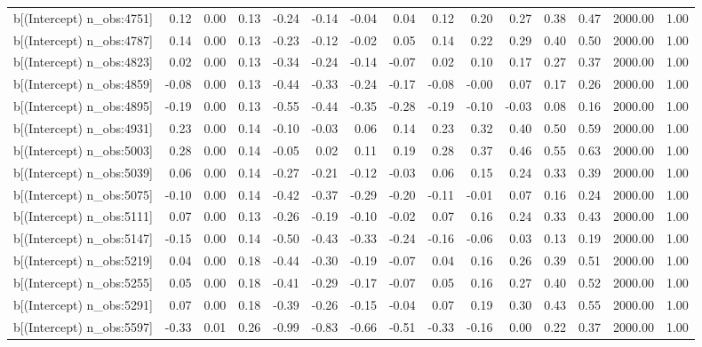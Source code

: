 \begin{table}[ht]
\begin{tabular}{rrrrrrrrrrrrrrr}
  b[(Intercept) n\_obs:4751] & 0.12 & 0.00 & 0.13 & -0.24 & -0.14 & -0.04 & 0.04 & 0.12 & 0.20 & 0.27 & 0.38 & 0.47 & 2000.00 & 1.00 \\ 
  b[(Intercept) n\_obs:4787] & 0.14 & 0.00 & 0.13 & -0.23 & -0.12 & -0.02 & 0.05 & 0.14 & 0.22 & 0.29 & 0.40 & 0.50 & 2000.00 & 1.00 \\ 
  b[(Intercept) n\_obs:4823] & 0.02 & 0.00 & 0.13 & -0.34 & -0.24 & -0.14 & -0.07 & 0.02 & 0.10 & 0.17 & 0.27 & 0.37 & 2000.00 & 1.00 \\ 
  b[(Intercept) n\_obs:4859] & -0.08 & 0.00 & 0.13 & -0.44 & -0.33 & -0.24 & -0.17 & -0.08 & -0.00 & 0.07 & 0.17 & 0.26 & 2000.00 & 1.00 \\ 
  b[(Intercept) n\_obs:4895] & -0.19 & 0.00 & 0.13 & -0.55 & -0.44 & -0.35 & -0.28 & -0.19 & -0.10 & -0.03 & 0.08 & 0.16 & 2000.00 & 1.00 \\ 
  b[(Intercept) n\_obs:4931] & 0.23 & 0.00 & 0.14 & -0.10 & -0.03 & 0.06 & 0.14 & 0.23 & 0.32 & 0.40 & 0.50 & 0.59 & 2000.00 & 1.00 \\ 
  b[(Intercept) n\_obs:5003] & 0.28 & 0.00 & 0.14 & -0.05 & 0.02 & 0.11 & 0.19 & 0.28 & 0.37 & 0.46 & 0.55 & 0.63 & 2000.00 & 1.00 \\ 
  b[(Intercept) n\_obs:5039] & 0.06 & 0.00 & 0.14 & -0.27 & -0.21 & -0.12 & -0.03 & 0.06 & 0.15 & 0.24 & 0.33 & 0.39 & 2000.00 & 1.00 \\ 
  b[(Intercept) n\_obs:5075] & -0.10 & 0.00 & 0.14 & -0.42 & -0.37 & -0.29 & -0.20 & -0.11 & -0.01 & 0.07 & 0.16 & 0.24 & 2000.00 & 1.00 \\ 
  b[(Intercept) n\_obs:5111] & 0.07 & 0.00 & 0.13 & -0.26 & -0.19 & -0.10 & -0.02 & 0.07 & 0.16 & 0.24 & 0.33 & 0.43 & 2000.00 & 1.00 \\ 
  b[(Intercept) n\_obs:5147] & -0.15 & 0.00 & 0.14 & -0.50 & -0.43 & -0.33 & -0.24 & -0.16 & -0.06 & 0.03 & 0.13 & 0.19 & 2000.00 & 1.00 \\ 
  b[(Intercept) n\_obs:5219] & 0.04 & 0.00 & 0.18 & -0.44 & -0.30 & -0.19 & -0.07 & 0.04 & 0.16 & 0.26 & 0.39 & 0.51 & 2000.00 & 1.00 \\ 
  b[(Intercept) n\_obs:5255] & 0.05 & 0.00 & 0.18 & -0.41 & -0.29 & -0.17 & -0.07 & 0.05 & 0.16 & 0.27 & 0.40 & 0.52 & 2000.00 & 1.00 \\ 
  b[(Intercept) n\_obs:5291] & 0.07 & 0.00 & 0.18 & -0.39 & -0.26 & -0.15 & -0.04 & 0.07 & 0.19 & 0.30 & 0.43 & 0.55 & 2000.00 & 1.00 \\ 
  b[(Intercept) n\_obs:5597] & -0.33 & 0.01 & 0.26 & -0.99 & -0.83 & -0.66 & -0.51 & -0.33 & -0.16 & 0.00 & 0.22 & 0.37 & 2000.00 & 1.00 \\ 

\end{tabular}
\end{table}
